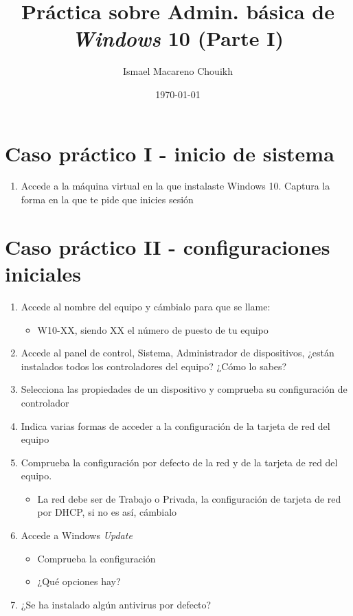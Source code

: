 \documentclass[11pt]{article}
\author{Ismael Macareno Chouikh}
\date{\today}
\title{Práctica sobre Admin. básica de \emph{Windows} 10 (Parte I)}
\newcommand\blankpage{\null\thispagestyle{empty}\newpage}
\begin{document}
\maketitle
\tableofcontents

\blankpage

\section{Caso práctico I - inicio de sistema}
\label{sec:org2467d50}
\begin{enumerate}
\item Accede a la máquina virtual en la que instalaste Windows 10. Captura la forma en la que te pide que inicies sesión
\end{enumerate}

\section{Caso práctico II - configuraciones iniciales}
\label{sec:org28e8999}
\begin{enumerate}
\item Accede al nombre del equipo y cámbialo para que se llame:
\begin{itemize}
\item W10-XX, siendo XX el número de puesto de tu equipo
\end{itemize}
\item Accede al panel de control, Sistema, Administrador de dispositivos, ¿están instalados todos los controladores del equipo? ¿Cómo lo sabes?
\item Selecciona las propiedades de un dispositivo y comprueba su configuración de controlador
\item Indica varias formas de acceder a la configuración de la tarjeta de red del equipo
\item Comprueba la configuración por defecto de la red y de la tarjeta de red del equipo.
\begin{itemize}
\item La red debe ser de Trabajo o Privada, la configuración de tarjeta de red por DHCP, si no es así, cámbialo
\end{itemize}
\item Accede a Windows \emph{Update}
\begin{itemize}
\item Comprueba la configuración
\item ¿Qué opciones hay?
\end{itemize}
\item ¿Se ha instalado algún antivirus por defecto?
\end{enumerate}
\end{document}
